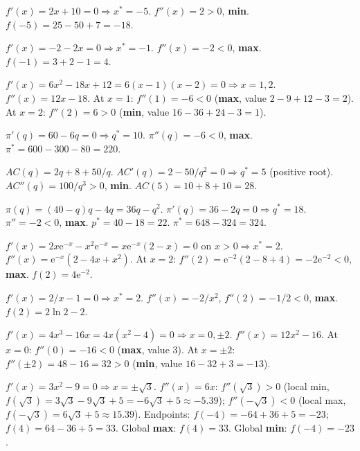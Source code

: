 \begin{solutions}
    \item $f'(x) = 2 x + 10 = 0 \Rightarrow x^* = -5$. $f''(x) = 2 > 0$,
          \textbf{min}. $f(-5) = 25 - 50 + 7 = -18$.
    \item $f'(x) = -2 - 2 x = 0 \Rightarrow x^* = -1$. $f''(x) = -2 < 0$,
          \textbf{max}. $f(-1) = 3 + 2 - 1 = 4$.
    \item $f'(x) = 6 x^2 - 18 x + 12 = 6(x - 1)(x - 2) = 0 \Rightarrow
          x = 1, 2$. $f''(x) = 12 x - 18$. At $x = 1$: $f''(1) = -6 < 0$
          (\textbf{max}, value $2 - 9 + 12 - 3 = 2$). At $x = 2$:
          $f''(2) = 6 > 0$ (\textbf{min}, value $16 - 36 + 24 - 3 = 1$).
    \item $\pi'(q) = 60 - 6 q = 0 \Rightarrow q^* = 10$.
          $\pi''(q) = -6 < 0$, \textbf{max}.
          $\pi^* = 600 - 300 - 80 = 220$.
    \item $AC(q) = 2 q + 8 + 50/q$. $AC'(q) = 2 - 50/q^2 = 0 \Rightarrow
          q^* = 5$ (positive root). $AC''(q) = 100/q^3 > 0$, \textbf{min}.
          $AC(5) = 10 + 8 + 10 = 28$.
    \item $\pi(q) = (40 - q) q - 4 q = 36 q - q^2$.
          $\pi'(q) = 36 - 2 q = 0 \Rightarrow q^* = 18$. $\pi'' = -2 < 0$,
          \textbf{max}. $p^* = 40 - 18 = 22$. $\pi^* = 648 - 324 = 324$.
    \item $f'(x) = 2 x \mathrm{e}^{-x} - x^2 \mathrm{e}^{-x} =
          x \mathrm{e}^{-x}(2 - x) = 0$ on $x > 0 \Rightarrow x^* = 2$.
          $f''(x) = \mathrm{e}^{-x}(2 - 4 x + x^2)$. At $x = 2$:
          $f''(2) = \mathrm{e}^{-2}(2 - 8 + 4) = -2 \mathrm{e}^{-2} < 0$,
          \textbf{max}. $f(2) = 4 \mathrm{e}^{-2}$.
    \item $f'(x) = 2/x - 1 = 0 \Rightarrow x^* = 2$. $f''(x) = -2/x^2$,
          $f''(2) = -1/2 < 0$, \textbf{max}. $f(2) = 2 \ln 2 - 2$.
    \item $f'(x) = 4 x^3 - 16 x = 4 x(x^2 - 4) = 0 \Rightarrow
          x = 0, \pm 2$. $f''(x) = 12 x^2 - 16$. At $x = 0$:
          $f''(0) = -16 < 0$ (\textbf{max}, value $3$). At $x = \pm 2$:
          $f''(\pm 2) = 48 - 16 = 32 > 0$ (\textbf{min}, value
          $16 - 32 + 3 = -13$).
    \item $f'(x) = 3 x^2 - 9 = 0 \Rightarrow x = \pm \sqrt{3}$.
          $f''(x) = 6 x$: $f''(\sqrt{3}) > 0$ (local min,
          $f(\sqrt{3}) = 3\sqrt{3} - 9\sqrt{3} + 5 = -6\sqrt{3} + 5 \approx
          -5.39$); $f''(-\sqrt{3}) < 0$ (local max,
          $f(-\sqrt{3}) = 6\sqrt{3} + 5 \approx 15.39$). Endpoints:
          $f(-4) = -64 + 36 + 5 = -23$; $f(4) = 64 - 36 + 5 = 33$. Global
          \textbf{max}: $f(4) = 33$. Global \textbf{min}: $f(-4) = -23$.
\end{solutions}
